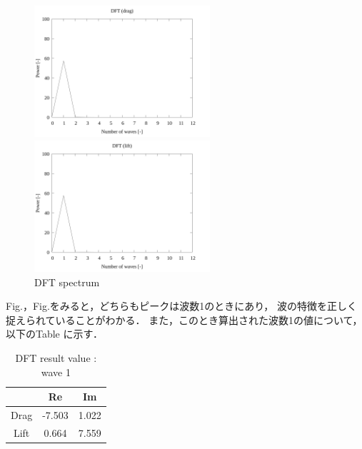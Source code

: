 \begin{figure}
        \begin{minipage}[b]{0.45\linewidth}
        \centering
        \includegraphics[width=65mm]{../../02_workspace/result/2-ex/plot/07/07-3_dft-drag.png}
      \end{minipage}
      \begin{minipage}[b]{0.45\linewidth}
        \centering
        \includegraphics[width=65mm]{../../02_workspace/result/2-ex/plot/07/07-4_dft-lift.png}
      \end{minipage}
      \caption{DFT spectrum}
\end{figure}

Fig.，Fig.をみると，どちらもピークは波数1のときにあり，
波の特徴を正しく捉えられていることがわかる．
また，このとき算出された波数1の値について，以下のTable に示す．

\begin{table}[htbp]
  \begin{center}
      \caption{DFT result value : wave 1}
      \begin{tabular}{|p{30mm}|p{20mm}|p{20mm}|}
          \hline
          \multicolumn{1}{|c|}{}     & \multicolumn{1}{|c|}{Re}    & \multicolumn{1}{|c|}{Im}   \\ \hline
          \multicolumn{1}{|c|}{Drag} & \multicolumn{1}{|c|}{-7.503} & \multicolumn{1}{|c|}{1.022}  \\ \hline
          \multicolumn{1}{|c|}{Lift} & \multicolumn{1}{|c|}{0.664}  & \multicolumn{1}{|c|}{7.559} \\ \hline
      \end{tabular}
  \end{center}
\end{table}

